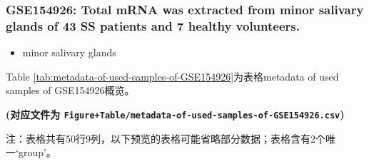 \documentclass[
]{article}
\providecommand{\tightlist}{%
  \setlength{\itemsep}{0pt}\setlength{\parskip}{0pt}}
\begin{document}
\hypertarget{gse154926-total-mrna-was-extracted-from-minor-salivary-glands-of-43-ss-patients-and-7-healthy-volunteers.}{%
\subsubsection{GSE154926: Total mRNA was extracted from minor salivary glands of 43 SS patients and 7 healthy volunteers.}\label{gse154926-total-mrna-was-extracted-from-minor-salivary-glands-of-43-ss-patients-and-7-healthy-volunteers.}}

\begin{itemize}
\tightlist
\item
  minor salivary glands
\end{itemize}

Table \ref{tab:metadata-of-used-samples-of-GSE154926}为表格metadata of used samples of GSE154926概览。

\textbf{(对应文件为 \texttt{Figure+Table/metadata-of-used-samples-of-GSE154926.csv})}

\begin{center}\begin{tcolorbox}[colback=gray!10, colframe=gray!50, width=0.9\linewidth, arc=1mm, boxrule=0.5pt]注：表格共有50行9列，以下预览的表格可能省略部分数据；表格含有2个唯一`group'。
\end{tcolorbox}
\end{center}
\end{document}
